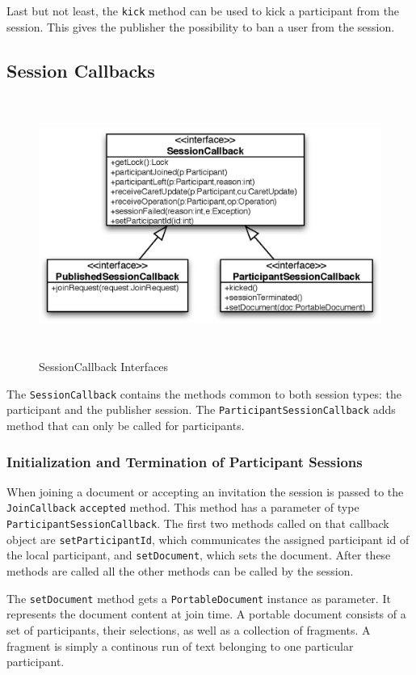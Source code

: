 Last but not least, the \texttt{kick} method can be used to kick a
participant from the session. This gives the publisher the possibility to
ban a user from the session.


\subsection{Session Callbacks}
\begin{figure}[H]
 \centering
 \includegraphics[width=14.89cm,height=8.47cm]{../images/finalreport/architecture_sessioncallback_uml.eps}
 \caption{SessionCallback Interfaces}
 \label{fig:archoverview.sessioncallback}
\end{figure}

The \texttt{SessionCallback} contains the methods common to both session types:
the participant and the publisher session. The 
\texttt{ParticipantSessionCallback} adds method that can only be called for
participants.


\subsubsection{Initialization and Termination of Participant Sessions}
When joining a document or accepting an invitation the session is passed to
the \texttt{JoinCallback} \texttt{accepted} method. This method has a
parameter of type \texttt{ParticipantSessionCallback}. The first two
methods called on that callback object are \texttt{setParticipantId}, which 
communicates the assigned participant id of the local participant, and 
\texttt{setDocument}, which sets the document. After these methods are called
all the other methods can be called by the session.

The \texttt{setDocument} method gets a \texttt{PortableDocument} instance
as parameter. It represents the document content at join time. A portable
document consists of a set of participants, their selections, as well as
a collection of fragments. A fragment is simply a continous run of text
belonging to one particular participant.

